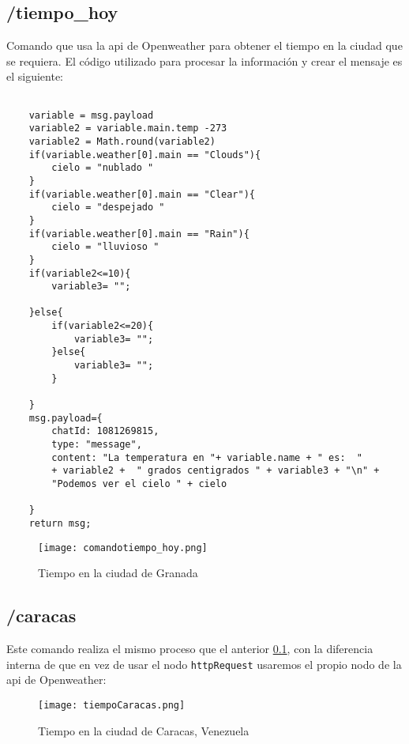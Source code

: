 \documentclass[12pt]{article}
\begin{document}
\subsection{/tiempo\_hoy}\label{ch:t_hoy}

Comando que usa la api de Openweather para obtener el tiempo en la ciudad que se requiera. 
El código utilizado para procesar la información y crear el mensaje es el siguiente:\\

\begin{verbatim}
    
    variable = msg.payload
    variable2 = variable.main.temp -273
    variable2 = Math.round(variable2)
    if(variable.weather[0].main == "Clouds"){
        cielo = "nublado "
    }
    if(variable.weather[0].main == "Clear"){
        cielo = "despejado "
    }
    if(variable.weather[0].main == "Rain"){
        cielo = "lluvioso "
    }
    if(variable2<=10){
        variable3= "";
        
    }else{
        if(variable2<=20){
            variable3= "";
        }else{
            variable3= "";
        }
        
    }
    msg.payload={
        chatId: 1081269815,
        type: "message",
        content: "La temperatura en "+ variable.name + " es:  " 
        + variable2 +  " grados centigrados " + variable3 + "\n" +
        "Podemos ver el cielo " + cielo
        
    }
    return msg;
\end{verbatim}


\begin{figure}[H]
    \centering
    \texttt{[image: comandotiempo\_hoy.png]}
    \caption{Tiempo en la ciudad de Granada}
    \label{ebot_thoy}
\end{figure}

\subsection{/caracas}

Este comando realiza el mismo proceso que el anterior \ref{ch:t_hoy}, con la diferencia interna de que en vez de usar
el nodo \verb|httpRequest| usaremos el propio nodo de la api de Openweather: 

\begin{figure}[H]
    \centering
    \texttt{[image: tiempoCaracas.png]}
    \caption{Tiempo en la ciudad de Caracas, Venezuela}
    \label{tencaracas}
\end{figure}
\end{document}
